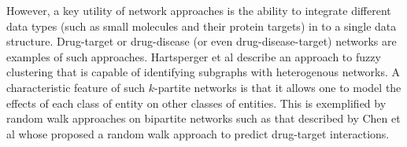 \documentclass[]{book}
\begin{document}
However, a key utility of network approaches is the ability to
integrate different data types (such as small molecules and their
protein targets) in to a single data structure. Drug-target or
drug-disease (or even drug-disease-target) networks are examples of
such approaches. Hartsperger et al \cite{Hartsperger:2010yg} describe
an approach to fuzzy clustering that is capable of identifying
subgraphs with heterogenous networks. A characteristic feature of such
$k$-partite networks is that it allows one to model the effects of
each class of entity on other classes of entities. This is exemplified
by random walk approaches on bipartite networks such as that described
by Chen et al \cite{Chen:2012qy} whose proposed a random walk approach
to predict drug-target interactions.


\end{document}
